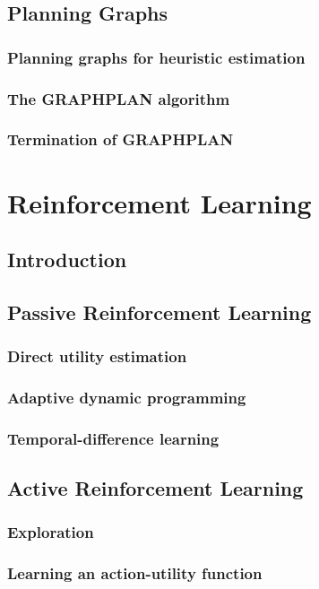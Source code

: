 \documentclass[11pt]{article}
\begin{document}
\subsection{Planning Graphs}

\subsubsection{Planning graphs for heuristic estimation}

\subsubsection{The GRAPHPLAN algorithm}

\subsubsection{Termination of GRAPHPLAN}

\subsection{}

\newpage
\setcounter{section}{20}
\section{Reinforcement Learning}

\subsection{Introduction}

\subsection{Passive Reinforcement Learning}

\subsubsection{Direct utility estimation}

\subsubsection{Adaptive dynamic programming}

\subsubsection{Temporal-difference learning}

\subsection{Active Reinforcement Learning}

\subsubsection{Exploration}

\subsubsection{Learning an action-utility function}
\end{document}
